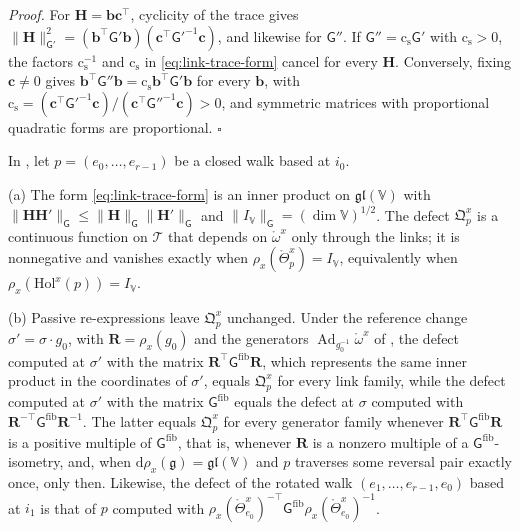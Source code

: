 \noindent\emph{Proof.}
For $\mathbf H=\mathbf b\mathbf c^\top$, cyclicity of the trace gives
$\lVert\mathbf H\rVert^2_{\mathsf G'}=(\mathbf b^\top\mathsf G'\mathbf b)(\mathbf c^\top\mathsf G'^{-1}\mathbf c)$,
and likewise for $\mathsf G''$. If $\mathsf G''=\mathrm c_{\mathrm s}\mathsf G'$ with $\mathrm c_{\mathrm s}>0$,
the factors $\mathrm c_{\mathrm s}^{-1}$ and $\mathrm c_{\mathrm s}$ in \cref{eq:link-trace-form} cancel for
every $\mathbf H$. Conversely, fixing $\mathbf c\neq0$ gives
$\mathbf b^\top\mathsf G''\mathbf b=\mathrm c_{\mathrm s}\mathbf b^\top\mathsf G'\mathbf b$ for every
$\mathbf b$, with
$\mathrm c_{\mathrm s}=(\mathbf c^\top\mathsf G'^{-1}\mathbf c)/(\mathbf c^\top\mathsf G''^{-1}\mathbf c)>0$,
and symmetric matrices with proportional quadratic forms are proportional. \hfill$\square$

In , let $p=(e_0,\ldots,e_{r-1})$ be a closed walk based at $i_0$.

(a) The form \cref{eq:link-trace-form} is an inner product on $\mathfrak{gl}(\mathbb V)$ with
$\lVert\mathbf H\mathbf H'\rVert_{\mathsf G}\leq\lVert\mathbf H\rVert_{\mathsf G}\lVert\mathbf H'\rVert_{\mathsf G}$
and $\lVert I_{\mathbb V}\rVert_{\mathsf G}=(\dim\mathbb V)^{1/2}$. The defect $\mathfrak Q^x_p$ is a
continuous function on $\mathscr T$ that depends on $\mathring\omega^x$ only through the links; it is
nonnegative and vanishes exactly when $\rho_x(\mathring\Theta^x_p)=I_{\mathbb V}$, equivalently when
$\rho_x(\mathrm{Hol}^x(p))=I_{\mathbb V}$.

(b) Passive re-expressions leave $\mathfrak Q^x_p$ unchanged. Under the reference change
$\sigma'=\sigma\cdot g_0$, with $\mathbf R=\rho_x(g_0)$ and the generators
$\operatorname{Ad}_{g_0^{-1}}\mathring\omega^x$ of , the defect computed
at $\sigma'$ with the matrix $\mathbf R^\top\mathsf G^{\mathrm{fib}}\mathbf R$, which represents the same
inner product in the coordinates of $\sigma'$, equals $\mathfrak Q^x_p$ for every link family, while the
defect computed at $\sigma'$ with the matrix $\mathsf G^{\mathrm{fib}}$ equals the defect at $\sigma$
computed with $\mathbf R^{-\top}\mathsf G^{\mathrm{fib}}\mathbf R^{-1}$. The latter equals
$\mathfrak Q^x_p$ for every generator family whenever $\mathbf R^\top\mathsf G^{\mathrm{fib}}\mathbf R$ is
a positive multiple of $\mathsf G^{\mathrm{fib}}$, that is, whenever $\mathbf R$ is a nonzero multiple of a
$\mathsf G^{\mathrm{fib}}$-isometry, and, when
$\mathrm d\rho_x(\mathfrak g)=\mathfrak{gl}(\mathbb V)$ and $p$ traverses some reversal pair exactly
once, only then. Likewise, the defect of the rotated walk $(e_1,\ldots,e_{r-1},e_0)$ based at $i_1$ is
that of $p$ computed with
$\rho_x(\mathring\Theta^x_{e_0})^{-\top}\mathsf G^{\mathrm{fib}}\rho_x(\mathring\Theta^x_{e_0})^{-1}$.

